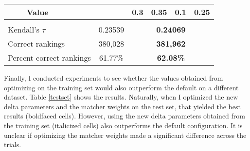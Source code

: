 \documentclass[paper=a4, fontsize=11pt]{scrartcl}
\numberwithin{equation}{section}		%
\numberwithin{figure}{section}			%
\numberwithin{table}{section}				%
\begin{document}
\begin{table}[htbp]
{\begin{tabular}{llllllclll|}
\multicolumn{1}{|l|}{}                                      & \multicolumn{1}{l|}{Value}         &                          &                          &                          & \multicolumn{1}{l|}{}    & \multicolumn{1}{l|}{0.3}     & \multicolumn{1}{l|}{0.35} & \multicolumn{1}{l|}{0.1}   & 0.25                      \\ \hline
\multicolumn{1}{|l}{}                                       &                                    &                          &                          &                          &                          & \multicolumn{1}{l}{}         &                           &                            &                           \\ \hline
\multicolumn{2}{|l|}{Kendall's $\tau$}                                                           & \multicolumn{4}{c|}{0.23539}                                                                              & \multicolumn{4}{c|}{{\bf 0.24069}}                                                                                \\ \hline
\multicolumn{2}{|l|}{Correct rankings}                                                           & \multicolumn{4}{c|}{380,028}                                                                              & \multicolumn{4}{c|}{{\bf 381,962}}                                                                                \\ \hline
\multicolumn{2}{|l|}{Percent correct rankings}                                                   & \multicolumn{4}{c|}{61.77\%}                                                                              & \multicolumn{4}{c|}{{\bf 62.08\%}}                                                                                \\ \hline
\end{tabular}}
\end{table}

Finally, I conducted experiments to see whether the values obtained from optimizing on the training set would also outperform the default on a different dataset.  Table \ref{testset} shows the results.  Naturally, when I optimized the new delta parameters and the matcher weights on the test set, that yielded the best results (boldfaced cells).  However, using the new delta parameters obtained from the training set (italicized cells) also outperforms the default configuration.  It is unclear if optimizing the matcher weights made a significant difference across the trials.
\end{document}

